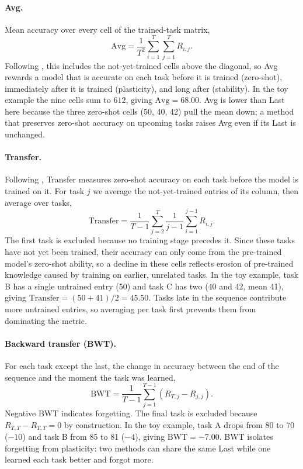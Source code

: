 \paragraph{Avg.} Mean accuracy over every cell of the trained-task matrix,
\begin{equation}
\text{Avg} = \frac{1}{T^2}\sum_{i=1}^{T}\sum_{j=1}^{T} R_{i,j}.
\end{equation}
Following \citet{zheng2023zscl}, this includes the not-yet-trained cells above the diagonal, so Avg rewards a model that is accurate on each task before it is trained (zero-shot), immediately after it is trained (plasticity), and long after (stability). In the toy example the nine cells sum to $612$, giving $\text{Avg} = 68.00$. Avg is lower than Last here because the three zero-shot cells (50, 40, 42) pull the mean down; a method that preserves zero-shot accuracy on upcoming tasks raises Avg even if its Last is unchanged.

\paragraph{Transfer.} Following \citet{zheng2023zscl}, Transfer measures zero-shot accuracy on each task before the model is trained on it. For task $j$ we average the not-yet-trained entries of its column, then average over tasks,
\begin{equation}
\text{Transfer} = \frac{1}{T-1}\sum_{j=2}^{T} \frac{1}{j-1}\sum_{i=1}^{j-1} R_{i,j}.
\end{equation}
The first task is excluded because no training stage precedes it. Since these tasks have not yet been trained, their accuracy can only come from the pre-trained model's zero-shot ability, so a decline in these cells reflects erosion of pre-trained knowledge caused by training on earlier, unrelated tasks. In the toy example, task B has a single untrained entry (50) and task C has two (40 and 42, mean 41), giving $\text{Transfer} = (50 + 41)/2 = 45.50$. Tasks late in the sequence contribute more untrained entries, so averaging per task first prevents them from dominating the metric.

\paragraph{Backward transfer (BWT).} For each task except the last, the change in accuracy between the end of the sequence and the moment the task was learned,
\begin{equation}
\text{BWT} = \frac{1}{T-1}\sum_{j=1}^{T-1} \left(R_{T,j} - R_{j,j}\right).
\end{equation}
Negative BWT indicates forgetting. The final task is excluded because $R_{T,T} - R_{T,T} = 0$ by construction. In the toy example, task A drops from 80 to 70 ($-10$) and task B from 85 to 81 ($-4$), giving $\text{BWT} = -7.00$. BWT isolates forgetting from plasticity: two methods can share the same Last while one learned each task better and forgot more.

